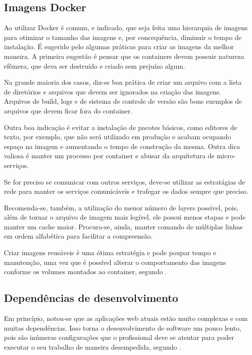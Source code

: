 \documentclass[
	12pt,				%
	openright,			%
	oneside,			%
	a4paper,			%
	chapter=TITLE,		%
	section=TITLE,		%
	english,			%
	french,				%
	spanish,			%
	brazil				%
	]{abntex2}
\begin{document}
\subsection{Imagens Docker}

Ao utilizar Docker é comum, e indicado, que seja feita uma hierarquia de imagens para otimizar o tamanho das imagens e, por concequência, diminuir o tempo de instalação. É sugerido pelo  algumas práticas para criar as imagens da melhor maneira. A primeira sugestão é pensar que os containers devem possuir natureza efêmera, que deva ser destruído e criado sem prejuízo algum.

Na grande maioria dos casos, diz-se boa prática de criar um arquivo com a lista de diretórios e arquivos que devem ser ignorados na criação das imagens. Arquivos de build, logs e de sistema de controle de versão são bons exemplos de arquivos que devem ficar fora do container.

Outra boa indicação é evitar a instalação de pacotes básicos, como editores de texto, por exemplo, que não será utilizado em produção e acabam ocupando espaço na imagem e aumentando o tempo de construção da mesma. Outra dica valiosa é manter um processo por container e abusar da arquitetura de micro-serviços.

Se for preciso se comunicar com outros serviços, deve-se utilizar as estratágias de rede para manter os serviços comunicáveis e trafegar os dados sempre que preciso.

Recomenda-se, também, a utilização do menor número de layers possível, pois, além de tornar o arquivo de imagem mais legível, ele possui menos etapas e pode manter um cache maior. Procura-se, ainda, manter comando de múltiplas linhas em ordem alfabética para facilitar a compreensão.

Criar imagens reusáveis é uma ótima estratégia e pode poupar tempo e manutenção, uma vez que é possível alterar o comportamento das imagens conforme os volumes montados ao container, segundo .

\subsection{Dependências de desenvolvimento}

Em princípio, notou-se que as aplicações web atuais estão muito complexas e com muitas dependências. Isso torna o desenvolvimento de software um pouco lento, pois são inúmeras configurações que o profissional deve se atentar para poder executar o seu trabalho de maneira desempedida, segundo .
\end{document}
